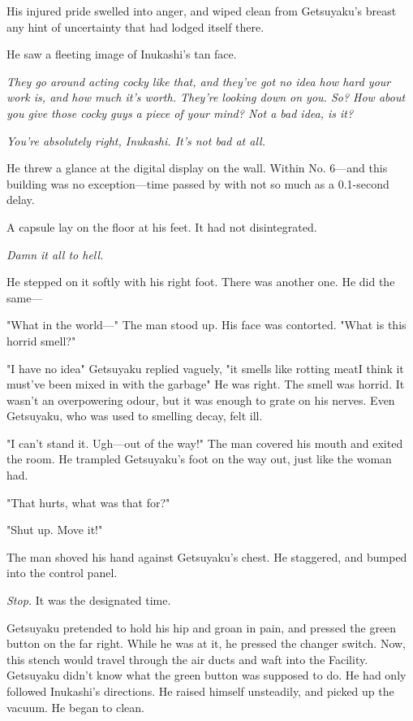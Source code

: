 His injured pride swelled into anger, and wiped clean from Getsuyaku's
breast any hint of uncertainty that had lodged itself there.

He saw a fleeting image of Inukashi's tan face.

\emph{They go around acting cocky like that, and they've got no idea how hard
your work is, and how much it's worth. They're looking down on you. So?
How about you give those cocky guys a piece of your mind? Not a bad
idea, is it?}

\emph{You're absolutely right, Inukashi. It's not bad at all.}

He threw a glance at the digital display on the wall. Within No. 6---and
this building was no exception---time passed by with not so much as a
0.1-second delay.

A capsule lay on the floor at his feet. It had not disintegrated.

\emph{Damn it all to hell.}

He stepped on it softly with his right foot. There was another one. He
did the same---

"What in the world---" The man stood up. His face was contorted. "What is
this horrid smell?"

"I have no idea\el " Getsuyaku replied vaguely, "it smells like rotting
meat\el I think it must've been mixed in with the garbage\el " He was
right. The smell was horrid. It wasn't an overpowering odour, but it was
enough to grate on his nerves. Even Getsuyaku, who was used to smelling
decay, felt ill.

"I can't stand it. Ugh---out of the way!" The man covered his mouth and
exited the room. He trampled Getsuyaku's foot on the way out, just like
the woman had.

"That hurts, what was that for?"

"Shut up. Move it!"

The man shoved his hand against Getsuyaku's chest. He staggered, and
bumped into the control panel.

\emph{Stop.} It was the designated time.

Getsuyaku pretended to hold his hip and groan in pain, and pressed the
green button on the far right. While he was at it, he pressed the
changer switch. Now, this stench would travel through the air ducts and
waft into the Facility. Getsuyaku didn't know what the green button was
supposed to do. He had only followed Inukashi's directions. He raised
himself unsteadily, and picked up the vacuum. He began to clean.

